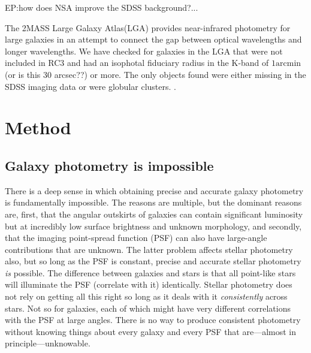 \documentclass[12pt,preprint,pdftex]{aastex}
\newcommand{\units}[1]{\mathrm{#1}}
\renewcommand{\arcmin}{\units{arcmin}}
\begin{document}
EP:how does NSA improve the SDSS background?...
 
The 2MASS Large Galaxy Atlas(LGA) provides near-infrared photometry
for large galaxies in an attempt to connect the gap between optical
wavelengths and longer wavelengths. We have checked for galaxies in
the LGA that were not included in RC3 and had an isophotal fiduciary
radius in the K-band of $1\arcmin$(or is this 30 arcsec??) or
more. The only objects found were either missing in the SDSS imaging
data or were globular clusters.  \citep{jarrett03}.

\section{Method} \label{sec:method}
\subsection{Galaxy photometry is impossible}\label{sec:philosophy}

There is a deep sense in which obtaining precise and accurate galaxy
photometry is fundamentally impossible.  The reasons are multiple, but
the dominant reasons are, first, that the angular outskirts of
galaxies can contain significant luminosity but at incredibly low
surface brightness and unknown morphology, and secondly, that the
imaging point-spread function (PSF) can also have large-angle
contributions that are unknown.  The latter problem affects stellar
photometry also, but so long as the PSF is constant, precise and
accurate stellar photometry \emph{is} possible.  The difference
between galaxies and stars is that all point-like stars will
illuminate the PSF (correlate with it) identically.  Stellar
photometry does not rely on getting all this right so long as it deals
with it \emph{consistently} across stars.  Not so for galaxies, each
of which might have very different correlations with the PSF at large
angles.  There is no way to produce consistent photometry without
knowing things about every galaxy and every PSF that are---almost in
principle---unknowable.
\end{document}

